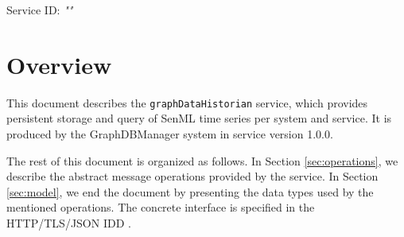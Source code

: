 \documentclass[a4paper]{arrowhead}
\begin{document}
\sloppy

\ArrowheadSetup

\begin{center}
  \vspace*{1cm}
  \huge{\arrowtitle}

  \vspace*{0.2cm}
  \LARGE{\arrowtype}
  \vspace*{1cm}

  \Large{Service ID: \textit{"\arrowid"}}

  \vspace*{\fill}


  \vspace*{1cm}
  \vspace*{\fill}

  \begin{abstract}
    This document describes the \texttt{graphDataHistorian} service, version 1.0.0, produced by the GraphDBManager support system of Arrowhead 5.2.2.
  \end{abstract}

  \vspace*{1cm}
\end{center}

\newpage

\tableofcontents
\newpage

\section{Overview}
\label{sec:overview}

This document describes the \texttt{graphDataHistorian} service, which provides persistent storage and query of SenML time series per system and service.
It is produced by the GraphDBManager system \cite{gdm-sysd} in service version 1.0.0.

The rest of this document is organized as follows.
In Section \ref{sec:operations}, we describe the abstract message operations provided by the service.
In Section \ref{sec:model}, we end the document by presenting the data types used by the mentioned operations.
The concrete interface is specified in the HTTP/TLS/JSON IDD \cite{gdm-graphDataHistorian-http-idd}.
\end{document}
